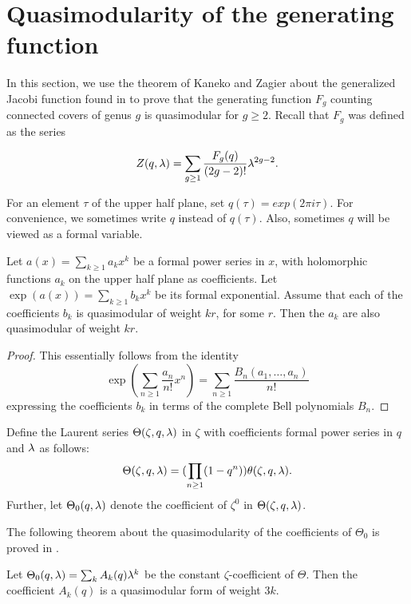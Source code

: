 \section{Quasimodularity of the generating function}

In this section, we use the theorem of Kaneko and Zagier about the generalized Jacobi function found in \cite{Kaneko-Zagier1995} to prove that the generating function $F_g$ counting connected covers of genus $g$ is quasimodular for $g\geq 2$. Recall that $F_g$ was defined as the series

 \[Z(q,\lambda) = \sum_{g\geq 1}\frac{F_g(q)}{(2g-2)!}\lambda^{2g-2}.\]
 
For an element $\tau$ of the upper half plane, set $q(\tau)=exp(2\pi i \tau)$. For convenience, we sometimes write $q$ instead of $q(\tau)$. Also, sometimes $q$ will be viewed as a formal variable.

\begin{prop} \label{prop:exp-quasimodular}
 Let $a(x)=\sum_{k\geq 1} a_k x^k$ be a formal power series in $x$, with holomorphic functions $a_k$ on the upper half plane as coefficients. Let $\exp(a(x))=\sum_{k\geq 1} b_k x^k$ be its formal exponential. Assume that each of the coefficients $b_k$ is quasimodular of weight $kr$, for some $r$. Then the $a_k$ are also quasimodular of weight $kr$.
\end{prop}
\begin{proof}
 This essentially follows from the identity
 \[
  \exp(\sum_{n\geq 1}\frac{a_n}{n!}x^n)=\sum_{n\geq 1}\frac{B_n(a_1,\dotsc,a_n)}{n!}
 \]
 expressing the coefficients $b_k$ in terms of the complete Bell polynomials $B_n$.
\end{proof}

\begin{defi}
 Define the Laurent series $\Theta(\zeta,q,\lambda)$ in $\zeta$ with coefficients formal power series in $q$ and $\lambda$ as follows:
 \[
  \Theta(\zeta,q,\lambda)=(\prod_{n\geq 1}(1-q^n))\theta(\zeta,q,\lambda).
 \]
 Further, let $\Theta_0(q,\lambda)$ denote the coefficient of $\zeta^0$ in $\Theta(\zeta,q,\lambda)$.
\end{defi}

The following theorem about the quasimodularity of the coefficients of $\Theta_0$ is proved in \cite{Kaneko-Zagier1995}.

\begin{thm}
 Let $\Theta_0(q,\lambda)=\sum_{k}A_k(q)\lambda^k$ be the constant $\zeta$-coefficient of $\Theta$. Then the coefficient $A_k(q)$ is a quasimodular form of weight $3k$.
\end{thm}

